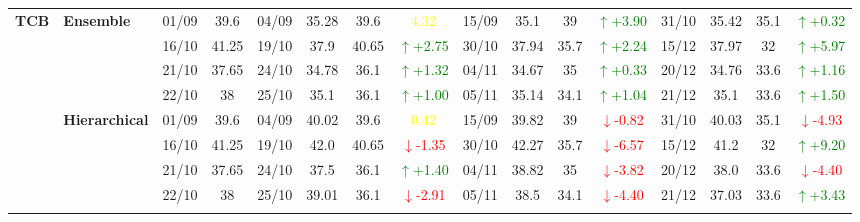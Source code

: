 \documentclass{ieeeaccess}
\begin{document}
{\begin{longtable}{llcc|cccc|cccc|cccc}
\multirow{12}{*}{\textbf{TCB}} 
& \textbf{Ensemble}
& 01/09 & 39.6 & 04/09 & 35.28 & 39.6 & \textcolor{yellow}{4.32} & 15/09 & 35.1 & 39 & \textcolor{green}{\(\uparrow\)+3.90} & 31/10 & 35.42 & 35.1 & \textcolor{green}{\(\uparrow\)+0.32} \\

&
& 16/10 & 41.25 & 19/10 & 37.9 & 40.65 & \textcolor{green}{\(\uparrow\)+2.75} & 30/10 & 37.94 & 35.7 & \textcolor{green}{\(\uparrow\)+2.24} & 15/12 & 37.97 & 32 & \textcolor{green}{\(\uparrow\)+5.97} \\

&
& 21/10 & 37.65 & 24/10 & 34.78 & 36.1 & \textcolor{green}{\(\uparrow\)+1.32} & 04/11 & 34.67 & 35 & \textcolor{green}{\(\uparrow\)+0.33} & 20/12 & 34.76 & 33.6 & \textcolor{green}{\(\uparrow\)+1.16} \\

&
& 22/10 & 38 & 25/10 & 35.1 & 36.1 & \textcolor{green}{\(\uparrow\)+1.00} & 05/11 & 35.14 & 34.1 & \textcolor{green}{\(\uparrow\)+1.04} & 21/12 & 35.1 & 33.6 & \textcolor{green}{\(\uparrow\)+1.50} \\
\cmidrule(lr){2-16}


& \textbf{Hierarchical}
& 01/09 & 39.6 & 04/09 & 40.02 & 39.6 & \textcolor{yellow}{0.42} & 15/09 & 39.82 & 39 & \textcolor{red}{\(\downarrow\)-0.82} & 31/10 & 40.03 & 35.1 & \textcolor{red}{\(\downarrow\)-4.93} \\

&
& 16/10 & 41.25 & 19/10 & 42.0 & 40.65 & \textcolor{red}{\(\downarrow\)-1.35} & 30/10 & 42.27 & 35.7 & \textcolor{red}{\(\downarrow\)-6.57} & 15/12 & 41.2 & 32 & \textcolor{green}{\(\uparrow\)+9.20} \\

&
& 21/10 & 37.65 & 24/10 & 37.5 & 36.1 & \textcolor{green}{\(\uparrow\)+1.40} & 04/11 & 38.82 & 35 & \textcolor{red}{\(\downarrow\)-3.82} & 20/12 & 38.0 & 33.6 & \textcolor{red}{\(\downarrow\)-4.40} \\

&
& 22/10 & 38 & 25/10 & 39.01 & 36.1 & \textcolor{red}{\(\downarrow\)-2.91} & 05/11 & 38.5 & 34.1 & \textcolor{red}{\(\downarrow\)-4.40} & 21/12 & 37.03 & 33.6 & \textcolor{green}{\(\uparrow\)+3.43} \\
\cmidrule(lr){2-16}




\end{longtable}}
\end{document}
